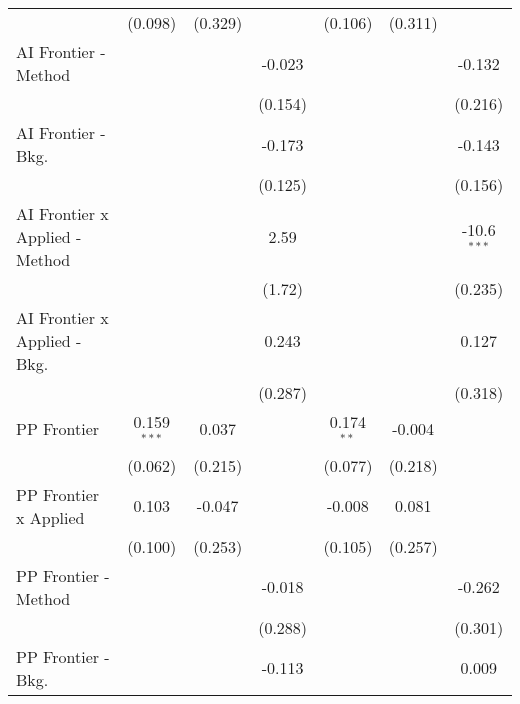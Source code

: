 \begin{tabular}{lcccccc}
                                  & (0.098)       & (0.329)      &               & (0.106)       & (0.311)      &   \\   
   AI Frontier - Method           &               &              & -0.023        &               &              & -0.132\\   
                                  &               &              & (0.154)       &               &              & (0.216)\\   
   AI Frontier - Bkg.             &               &              & -0.173        &               &              & -0.143\\   
                                  &               &              & (0.125)       &               &              & (0.156)\\   
   AI Frontier x Applied - Method &               &              & 2.59          &               &              & -10.6$^{***}$\\   
                                  &               &              & (1.72)        &               &              & (0.235)\\   
   AI Frontier x Applied - Bkg.   &               &              & 0.243         &               &              & 0.127\\   
                                  &               &              & (0.287)       &               &              & (0.318)\\   
   PP Frontier                    & 0.159$^{***}$ & 0.037        &               & 0.174$^{**}$  & -0.004       &   \\   
                                  & (0.062)       & (0.215)      &               & (0.077)       & (0.218)      &   \\   
   PP Frontier x Applied          & 0.103         & -0.047       &               & -0.008        & 0.081        &   \\   
                                  & (0.100)       & (0.253)      &               & (0.105)       & (0.257)      &   \\   
   PP Frontier - Method           &               &              & -0.018        &               &              & -0.262\\   
                                  &               &              & (0.288)       &               &              & (0.301)\\   
   PP Frontier - Bkg.             &               &              & -0.113        &               &              & 0.009\\   

\end{tabular}
